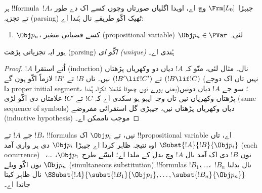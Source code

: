 \documentclass[../../../include/open-logic-section]{subfiles}
\begin{document}
\begin{prop}
ہر !!{formula}~$!A$، جیہڑا $ \Frm[L_0]$ وچ اے، اوہدا اگلیاں صورتاں
وچوں کسے اک دے طور تے تجزیہ (parsing) ٹھیک اکّو طریقے نال ہُندا اے:
\begin{enumerate}


\item $\Obj p_n$، کسے قضیاتی متغیر (propositional variable)
$\Obj p_n \in  \PVar$ لئی۔





\end{enumerate}
ہور ایہ تجزیاتی پڑھت (parsing) \emph{اکّو ای (unique)} ہُندی اے۔
\end{prop}

\begin{proof}
$!A$ اُتے استقرا (induction) نال۔ مثال لئی، منّو کہ $!A$ دیاں دو وکھریاں پڑھتاں
$(!B \lif !C)$ تے $(!B' \lif !C')$ نیں۔ تاں $!B$ تے $!B'$ لازماً
اکّو ہون گے (نہیں تاں اک دوجے دا proper initial segment، یعنی پورے توں
چھوٹا مُڈھلا ٹکڑا، ہُندا)؛ سو
جے $!A$ دیاں دونیں پڑھتاں وکھریاں نیں تاں وجہ ایہو ہو سکدی اے کہ
$!C$ تے $!C'$ علامتاں دی اکّو لڑی (same sequence of symbols) دیاں
وکھریاں پڑھتاں نیں، جیہڑی گل استقرائی مفروضے (inductive hypothesis)
موجب ناممکن اے۔
\end{proof}

\begin{defn}
جے $!A$ تے $!B$، !!{formula}s نیں، تے $\Obj p_i$ اک !!{propositional
variable} اے، تاں $\Subst{!A}{!B}{\Obj p_i}$ اوہ نتیجہ ظاہر کردا اے
جیہڑا $\Obj p_i$ دی ہر واری آمد (each occurrence) نوں $!B$ دی اک آمد
نال $!A$ وچ بدل کے ملدا اے؛ ایسّے طرح $\Obj p_1$، \dots،~$\Obj p_n$
نوں اکّو ویلے (simultaneous substitution)
!!{formula}s $!B_1$، \dots،~$!B_n$ نال بدلنا
$\SSubst{!A}{\subst{!B_1}{\Obj p_1},\dots,\subst{!B_n}{\Obj p_n}}$
نال ظاہر کیتا جاندا اے۔
\end{defn}
\end{document}
